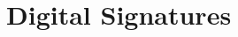 \section{Digital Signatures}\label{sec:digital_signatures}
\vspace{7.5cm}




\vspace{-1.5mm}
\newpage


